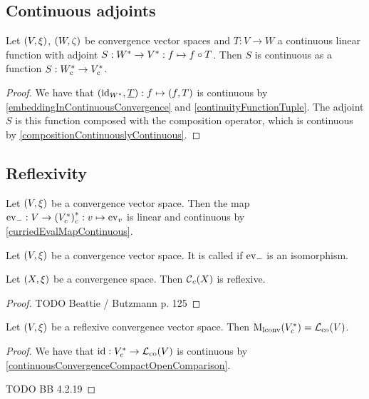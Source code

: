 \subsection{Continuous adjoints}
\begin{proposition}
Let $\sSet{V,\xi}$, $\sSet{W, \zeta}$ be convergence vector spaces and $T: V\to W$ a continuous linear function with adjoint $S: {W}^*\to {V}^*: f\mapsto f\circ T$. Then $S$ is continuous as a function $S: {W}^*_c\to {V}^*_c$.
\end{proposition}
\begin{proof}
We have that $(\operatorname{id}_{{W}^*}, \underline{T}): f\mapsto (f, T)$ is continuous by \ref{embeddingInContinuousConvergence} and \ref{continuityFunctionTuple}. The adjoint $S$ is this function composed with the composition operator, which is continuous by \ref{compositionContinuouslyContinuous}.
\end{proof}

\subsection{Reflexivity}
Let $\sSet{V,\xi}$ be a convergence vector space. Then the map $\operatorname{ev}_-: V\to {({V}^*_c)}^*_c: v\mapsto \operatorname{ev}_v$ is linear and continuous by \ref{curriedEvalMapContinuous}.

\begin{definition}
Let $\sSet{V,\xi}$ be a convergence vector space. It is called  if $\operatorname{ev}_-$ is an isomorphism.
\end{definition}

\begin{proposition}
Let $\sSet{X,\xi}$ be a convergence space. Then $\operatorname{\mathcal{C}}_c(X)$ is reflexive.
\end{proposition}
\begin{proof}
TODO Beattie / Butzmann p. 125
\end{proof}

\begin{proposition}
Let $\sSet{V,\xi}$ be a reflexive convergence vector space. Then $\operatorname{M_\text{lconv}}({V}^*_c) = \operatorname{\mathcal{L}}_\text{co}(V)$.
\end{proposition}
\begin{proof}
We have that $\operatorname{id}: {V}^*_c \to \operatorname{\mathcal{L}}_\text{co}(V)$ is continuous by \ref{continuousConvergenceCompactOpenComparison}.

TODO  BB 4.2.19
\end{proof}

